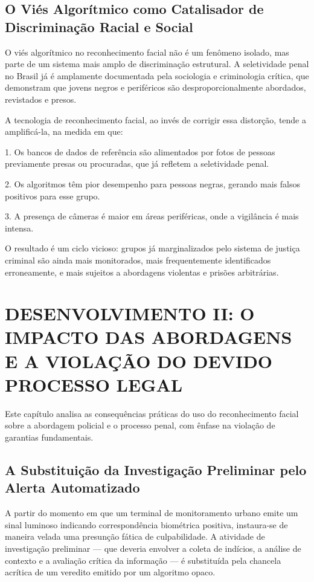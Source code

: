 \documentclass[12pt,a4paper]{article}
\begin{document}
\subsection{O Viés Algorítmico como Catalisador de Discriminação Racial e Social}

O viés algorítmico no reconhecimento facial não é um fenômeno isolado, mas parte de um sistema mais amplo de discriminação estrutural. A seletividade penal no Brasil já é amplamente documentada pela sociologia e criminologia crítica, que demonstram que jovens negros e periféricos são desproporcionalmente abordados, revistados e presos.

A tecnologia de reconhecimento facial, ao invés de corrigir essa distorção, tende a amplificá-la, na medida em que:

1. Os bancos de dados de referência são alimentados por fotos de pessoas previamente presas ou procuradas, que já refletem a seletividade penal.

2. Os algoritmos têm pior desempenho para pessoas negras, gerando mais falsos positivos para esse grupo.

3. A presença de câmeras é maior em áreas periféricas, onde a vigilância é mais intensa.

O resultado é um ciclo vicioso: grupos já marginalizados pelo sistema de justiça criminal são ainda mais monitorados, mais frequentemente identificados erroneamente, e mais sujeitos a abordagens violentas e prisões arbitrárias.

\section{DESENVOLVIMENTO II: O IMPACTO DAS ABORDAGENS E A VIOLAÇÃO DO DEVIDO PROCESSO LEGAL}

Este capítulo analisa as consequências práticas do uso do reconhecimento facial sobre a abordagem policial e o processo penal, com ênfase na violação de garantias fundamentais.

\subsection{A Substituição da Investigação Preliminar pelo Alerta Automatizado}

A partir do momento em que um terminal de monitoramento urbano emite um sinal luminoso indicando correspondência biométrica positiva, instaura-se de maneira velada uma presunção fática de culpabilidade. A atividade de investigação preliminar --- que deveria envolver a coleta de indícios, a análise de contexto e a avaliação crítica da informação --- é substituída pela chancela acrítica de um veredito emitido por um algoritmo opaco.
\end{document}
